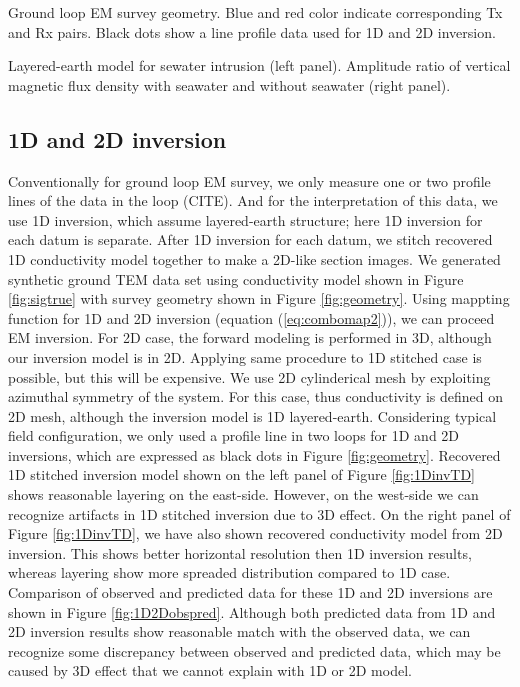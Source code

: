\documentclass{segabs}
\begin{document}
{Ground loop EM survey geometry. Blue and red color indicate corresponding Tx and Rx pairs. Black dots show a line profile data used for 1D and 2D inversion. }

{Layered-earth model for sewater intrusion (left panel). Amplitude ratio of vertical magnetic flux density with seawater and without seawater (right panel).}

\subsection*{1D and 2D inversion}
Conventionally for ground loop EM survey, we only measure one or two profile lines of the data in the loop (CITE). And for the interpretation of this data, we use 1D inversion, which assume layered-earth structure; here 1D inversion for each datum is separate. After 1D inversion for each datum, we stitch recovered 1D conductivity model together to make a 2D-like section images. We generated synthetic ground TEM data set using conductivity model shown in Figure \ref{fig:sigtrue} with survey geometry shown in Figure \ref{fig:geometry}. Using mappting function for 1D and 2D inversion (equation (\ref{eq:combomap2})), we can proceed EM inversion. For 2D case, the forward modeling is performed in 3D, although our inversion model is in 2D. Applying same procedure to 1D stitched case is possible, but this will be expensive. We use 2D cylinderical mesh by exploiting azimuthal symmetry of the system. For this case, thus conductivity is defined on 2D mesh, although the inversion model is 1D layered-earth. 
Considering typical field configuration, we only used a profile line in two loops for 1D and 2D inversions, which are expressed as black dots in Figure \ref{fig:geometry}.
Recovered 1D stitched inversion model shown on the left panel of Figure \ref{fig:1DinvTD} shows reasonable layering on the east-side. However, on the west-side we can recognize artifacts in 1D stitched inversion due to 3D effect. On the right panel of Figure \ref{fig:1DinvTD}, we have also shown recovered conductivity model from 2D inversion. This shows better horizontal resolution then 1D inversion results, whereas layering show more spreaded distribution compared to 1D case. Comparison of observed and predicted data for these 1D and 2D inversions are shown in Figure \ref{fig:1D2Dobspred}. Although both predicted data from 1D and 2D inversion results show reasonable match with the observed data, we can recognize some discrepancy between observed and predicted data, which may be caused by 3D effect that we cannot explain with 1D or 2D model.
\end{document}
